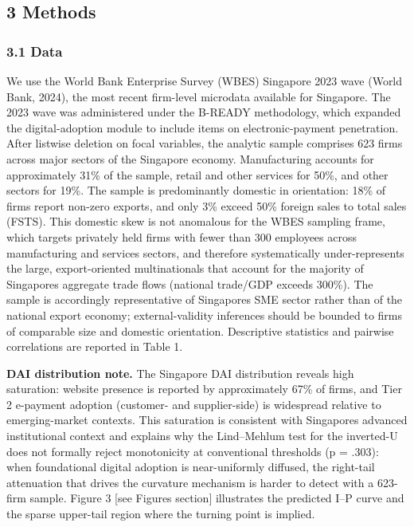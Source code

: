 \documentclass[12pt,a4paper]{article}
\begin{document}
\hypertarget{3-methods}{%
\subsection{3 Methods}\label{3-methods}}

\hypertarget{31-data}{%
\subsubsection{3.1 Data}\label{31-data}}

We use the World Bank Enterprise Survey (WBES) Singapore 2023 wave
(World Bank, 2024), the most recent firm-level microdata available for
Singapore. The 2023 wave was administered under the B-READY methodology,
which expanded the digital-adoption module to include items on
electronic-payment penetration. After listwise deletion on focal
variables, the analytic sample comprises 623 firms across major sectors
of the Singapore economy. Manufacturing accounts for approximately 31\%
of the sample, retail and other services for 50\%, and other sectors for
19\%. The sample is predominantly domestic in orientation: 18\% of firms
report non-zero exports, and only 3\% exceed 50\% foreign sales to total
sales (FSTS). This domestic skew is not anomalous for the WBES sampling
frame, which targets privately held firms with fewer than 300 employees
across manufacturing and services sectors, and therefore systematically
under-represents the large, export-oriented multinationals that account
for the majority of Singapore\textquotesingle s aggregate trade flows
(national trade/GDP exceeds 300\%). The sample is accordingly
representative of Singapore\textquotesingle s SME sector rather than of
the national export economy; external-validity inferences should be
bounded to firms of comparable size and domestic orientation.
Descriptive statistics and pairwise correlations are reported in Table
1.

\textbf{DAI distribution note.} The Singapore DAI distribution reveals
high saturation: website presence is reported by approximately 67\% of
firms, and Tier 2 e-payment adoption (customer- and supplier-side) is
widespread relative to emerging-market contexts. This saturation is
consistent with Singapore\textquotesingle s advanced institutional
context and explains why the Lind--Mehlum test for the inverted-U does
not formally reject monotonicity at conventional thresholds (p = .303):
when foundational digital adoption is near-uniformly diffused, the
right-tail attenuation that drives the curvature mechanism is harder to
detect with a 623-firm sample. Figure 3 {[}see Figures section{]}
illustrates the predicted I--P curve and the sparse upper-tail region
where the turning point is implied.
\end{document}
